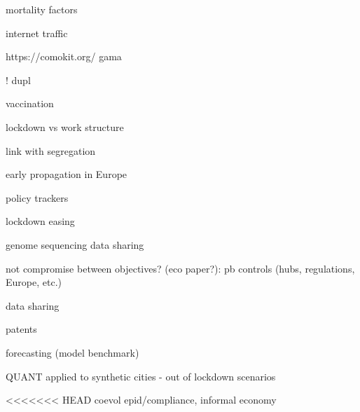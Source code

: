 \documentclass[10pt]{article}
\begin{document}
\cite{williamson2020opensafely} mortality factors

\cite{feldmann2020lockdown} internet traffic

https://comokit.org/ gama \cite{gaudou2020comokit}

\cite{murphy2020inside}

\cite{pullano2020underdetection}

\cite{mallapaty2020what}

\cite{Schlosser32883}

\cite{trump2020combine}

\cite{pullano2020underdetection} ! dupl

\cite{mallapaty2021covid} vaccination

\cite{heroy2020controlling} lockdown vs work structure

\cite{mallapaty2021major}

\cite{meng2021covid}

\cite{Torrats-Espinosae2015577118} link with segregation

\cite{nadeau2021origin} early propagation in Europe

\cite{schiermeier2021which} policy trackers

\cite{aschwanden2021five}

\cite{Shumskye2019225118}

\cite{cheetham2021determining}

\cite{irwin2021what}

\cite{mallapaty2021after}

\cite{10.1093/jtm/taab045}

\cite{mallapaty2021india}

\cite{andronico2021scenarios} lockdown easing

\cite{vogel2021do}

\cite{maxmen2021one} genome sequencing data sharing

\cite{oliu2021sars} not compromise between objectives? (eco paper?): pb controls (hubs, regulations, Europe, etc.)

\cite{maxmen2021why} data sharing

\cite{maxmen2021shock} patents

\cite{friedman2021forecasts} forecasting (model benchmark)

\cite{batty2021socially} QUANT applied to synthetic cities - out of lockdown scenarios

<<<<<<< HEAD
\cite{pires2021potential} coevol epid/compliance, informal economy
\end{document}
